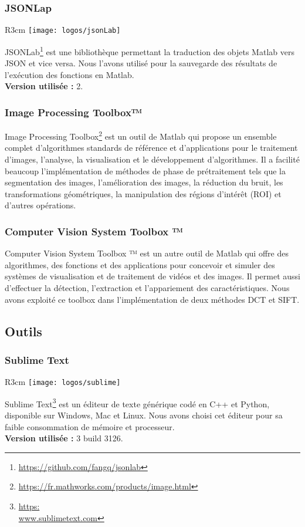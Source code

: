 \subsubsection{JSONLap }
\begin{wrapfigure}{R}{3cm}	\vspace{-20px}
	\texttt{[image: logos/jsonLab]}
\end{wrapfigure} 
JSONLab\footnote{\href{https://github.com/fangq/jsonlab}{https://github.com/fangq/jsonlab}} est une bibliothèque permettant la traduction des objets Matlab vers JSON et vice versa. Nous l’avons utilisé pour la sauvegarde des résultats de l’exécution des fonctions en Matlab. \\
\textbf{Version utilisée :} 2.
\subsubsection{Image Processing Toolbox™}
Image Processing Toolbox\footnote{\href{https://fr.mathworks.com/products/image.html}{https://fr.mathworks.com/products/image.html}} est un outil de Matlab qui propose un ensemble complet d’algorithmes standards de référence et d’applications pour le traitement d’images, l’analyse, la visualisation et le développement d’algorithmes. Il a facilité beaucoup l’implémentation de méthodes de phase de prétraitement tels que la segmentation des images, l’amélioration des images, la réduction du bruit, les transformations géométriques, la manipulation des régions d’intérêt (ROI) et d’autres opérations.
\subsubsection{Computer Vision System Toolbox ™}
Computer Vision System Toolbox ™ est un autre outil de Matlab qui offre des algorithmes, des fonctions et des applications pour concevoir et simuler des systèmes de visualisation et de traitement de vidéos et des images. Il permet aussi d’effectuer la détection, l'extraction et l’appariement des caractéristiques. Nous avons exploité ce toolbox dans l’implémentation de deux méthodes DCT et SIFT.

\subsection{Outils}	
\subsubsection{Sublime Text}
\begin{wrapfigure}{R}{3cm}	\vspace{-20px}
	\texttt{[image: logos/sublime]}
\end{wrapfigure} 
Sublime Text\footnote{\href{www.sublimetext.com}{https:\\www.sublimetext.com}} est un éditeur de texte générique codé en C++ et Python, disponible sur Windows, Mac et Linux. Nous avons choisi cet éditeur pour sa faible consommation de mémoire et processeur. \\
\textbf{Version utilisée :} 3 build 3126.


